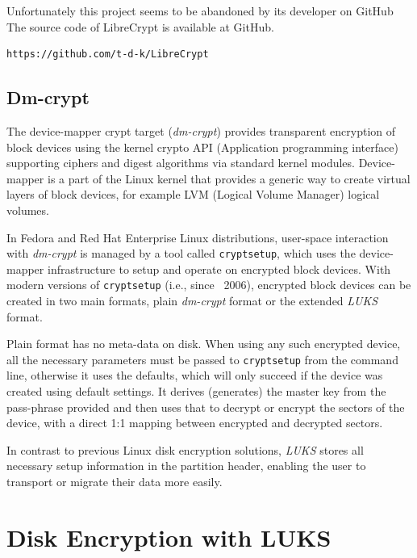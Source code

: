 Unfortunately this project seems to be abandoned by its developer on GitHub
The source code of LibreCrypt is available at GitHub.
\begin{lstlisting}[columns=fixed,basicstyle=\ttfamily\footnotesize,tabsize=4,backgroundcolor=\color{yellow!10}]
https://github.com/t-d-k/LibreCrypt
\end{lstlisting}



\subsection{Dm-crypt}\label{dm-crypt}

The device-mapper crypt target ({\it dm-crypt}) provides transparent encryption of block devices using the kernel crypto API (Application programming interface) supporting ciphers and digest algorithms via standard kernel modules.
Device-mapper is a part of the Linux kernel that provides a generic way to create virtual layers of block devices, for example LVM (Logical Volume Manager) logical volumes.

In Fedora and Red Hat Enterprise Linux distributions, user-space interaction with {\it dm-crypt} is managed by a tool called {\tt cryptsetup}, which uses the device-mapper infrastructure to setup and operate on encrypted block devices.
With modern versions of {\tt cryptsetup} (i.e., since ~2006), encrypted block devices can be created in two main formats, plain {\it dm-crypt} format or the extended {\it LUKS} format.

Plain format has no meta-data on disk.
When using any such encrypted device, all the necessary parameters must be passed to {\tt cryptsetup} from the command line, otherwise it uses the defaults, which will only succeed if the device was created using default settings.
It derives (generates) the master key from the pass-phrase provided and then uses that to decrypt or encrypt the sectors of the device, with a direct 1:1 mapping between encrypted and decrypted sectors.

In contrast to previous Linux disk encryption solutions, {\it LUKS} stores all necessary setup information in the partition header, enabling the user to transport or migrate their data more easily.



\section{Disk Encryption with LUKS}\label{LUKS}

